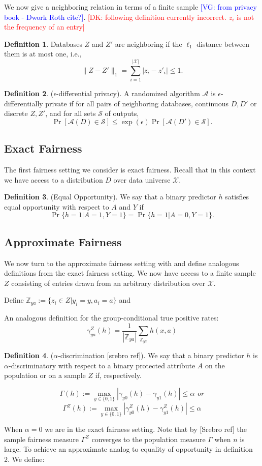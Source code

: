 \documentclass[format = sigconf]{acmart}
\newcommand{\dk}[1]{\textcolor{red}{[DK: #1]}}
\newcommand{\vg}[1]{\textcolor{blue}{[VG: #1]}}
\newcommand{\A}{\mathcal{A}}
\newcommand{\X}{\mathcal{X}}
\renewcommand{\S}{\mathcal{S}}
\newcommand{\1}{\mathbbm{1}}
\newcommand{\Z}{\mathbb{Z}}
\newcommand{\eps}{\epsilon}
\newcommand{\zya}{\Z_{ya}}
\theoremstyle{definition}
\newtheorem{defn}{Definition}[section]
\begin{document}
We now give a neighboring relation in terms of a finite sample \vg{from privacy book - Dwork Roth cite?}.
\dk {following definition currently incorrect. $z_i$ is not the frequency of an entry}
\begin{defn}
Databases $Z$ and $Z'$ are neighboring if the $\ell_1$ distance between them is at most one, i.e.,
$$ \|Z - Z'\|_1 = \sum_{i=1}^{|\X|} |z_i - z'_i| \leq 1.$$
\end{defn}

\begin{defn}
($\eps$-differential privacy). A randomized algorithm $\A$ is $\eps$-differentially private if for all pairs of neighboring databases, continuous $D, D'$ or discrete $Z, Z'$, and for all sets $\S$ of outputs,
	$$\Pr[\A(D)\in \S] \leq \exp(\eps)\Pr[\A(D')\in \S].$$
\end{defn}

\subsection{Exact Fairness}

The first fairness setting we consider is exact fairness. Recall that in this context we have access to a distribution $D$ over data universe $\X$.

\begin{defn}
	 (Equal Opportunity). We say that a binary predictor $h$ satisfies equal opportunity with respect to $A$ and $Y$ if
	$$\Pr\{h = 1 | A =1, Y=1\} = \Pr\{h = 1 | A=0, Y=1\}.$$
\end{defn}

\subsection{Approximate Fairness}
We now turn to the approximate fairness setting with and define analogous definitions from the exact fairness setting. We now have access to a finite sample $Z$ consisting of entries drawn from an arbitrary distribution over $\X$.

Define $\zya := \{z_i \in Z | y_i = y, a_i = a \}$ and

An analogous definition for the group-conditional true positive rates:
$$\gamma_{ya}^Z(h) = \frac{1}{|\zya|} \sum_{\zya} h(x,a)$$

\begin{defn}
	($\alpha$-discrimination [srebro ref]). We say that a binary predictor $h$ is $\alpha$-discriminatory with respect to a binary protected attribute $A$ on the population or on a sample $Z$ if, respectively.

$$\Gamma(h) := \max_{y\in \{0,1\}}|\gamma_{y0}(h) - \gamma_{y1}(h)| \leq \alpha ~~ or $$
$$\Gamma^Z(h) := \max_{y\in \{0,1\}}|\gamma_{y0}^Z(h) - \gamma_{y1}^Z(h)| \leq \alpha$$

\end{defn}
When $\alpha = 0$ we are in the exact fairness setting. Note that by [Srebro ref] the sample fairness measure $\Gamma^Z$ converges to the population measure $\Gamma$ when $n$ is large. To achieve an approximate analog to equality of opportunity in definition 2. We define:
\end{document}
